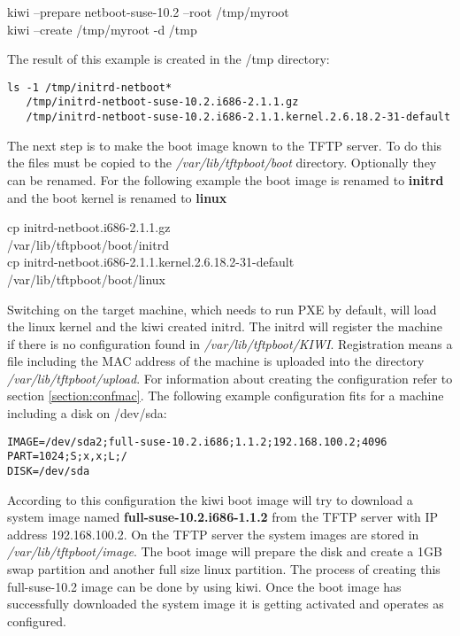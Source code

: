 \begin{Command}{13cm}
	kiwi --prepare netboot-suse-10.2 --root /tmp/myroot\\
	kiwi --create /tmp/myroot -d /tmp
\end{Command}

The result of this example is created in the /tmp directory:

\begin{verbatim}
ls -1 /tmp/initrd-netboot*
   /tmp/initrd-netboot-suse-10.2.i686-2.1.1.gz
   /tmp/initrd-netboot-suse-10.2.i686-2.1.1.kernel.2.6.18.2-31-default
\end{verbatim} 

The next step is to make the boot image known to the TFTP server.
To do this the files must be copied to the \textit{/var/lib/tftpboot/boot}
directory. Optionally they can be renamed. For the following
example the boot image is renamed to \textbf{initrd} and the boot kernel
is renamed to \textbf{linux}

\begin{Command}{13cm}
	cp initrd-netboot.i686-2.1.1.gz \bs \\
	\hspace*{2cm}/var/lib/tftpboot/boot/initrd\\
	cp initrd-netboot.i686-2.1.1.kernel.2.6.18.2-31-default \bs \\
	\hspace*{2cm}/var/lib/tftpboot/boot/linux\\
\end{Command}

Switching on the target machine, which needs to run PXE by default,
will load the linux kernel and the kiwi created initrd.
The initrd will register the machine if there is no configuration
found in \textit{/var/lib/tftpboot/KIWI}. Registration means a file
including the MAC address of the machine is uploaded into the directory
\textit{/var/lib/tftpboot/upload}. For information about creating the
configuration refer to section \ref{section:confmac}. The following
example configuration fits for a machine including a disk on /dev/sda:

\begin{verbatim}
IMAGE=/dev/sda2;full-suse-10.2.i686;1.1.2;192.168.100.2;4096
PART=1024;S;x,x;L;/
DISK=/dev/sda
\end{verbatim}

According to this configuration the kiwi boot image will try to download
a system image named \textbf{full-suse-10.2.i686-1.1.2} from
the TFTP server with IP address 192.168.100.2. On the TFTP server the
system images are stored in \textit{/var/lib/tftpboot/image}. The boot
image will prepare the disk and create a 1GB swap partition and another
full size linux partition. The process of creating this full-suse-10.2 image
can be done by using kiwi. Once the boot image has successfully downloaded
the system image it is getting activated and operates as configured. 

